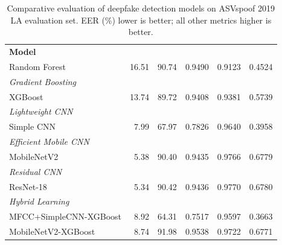 \begin{table}[ht]
  \centering
  \caption{Comparative evaluation of deepfake detection models on ASVspoof 2019 LA evaluation set. EER (\%) lower is better; all other metrics higher is better.}
  \label{tab:performance}
  \begin{tabular}{lrrrrr}
    \toprule
    \textbf{Model} & \textbf{EER (%
    \midrule
    \multicolumn{6}{l}{\textit{Classical Ensemble}} \\
    Random Forest & 16.51 & 90.74 & 0.9490 & 0.9123 & 0.4524 \\
    \midrule
    \multicolumn{6}{l}{\textit{Gradient Boosting}} \\
    XGBoost & 13.74 & 89.72 & 0.9408 & 0.9381 & 0.5739 \\
    \midrule
    \multicolumn{6}{l}{\textit{Lightweight CNN}} \\
    Simple CNN & 7.99 & 67.97 & 0.7826 & 0.9640 & 0.3958 \\
    \midrule
    \multicolumn{6}{l}{\textit{Efficient Mobile CNN}} \\
    MobileNetV2 & 5.38 & 90.40 & 0.9435 & 0.9766 & 0.6779 \\
    \midrule
    \multicolumn{6}{l}{\textit{Residual CNN}} \\
    ResNet-18 & 5.34 & 90.42 & 0.9436 & 0.9770 & 0.6780 \\
    \midrule
    \multicolumn{6}{l}{\textit{Hybrid Learning}} \\
    MFCC+SimpleCNN-XGBoost & 8.92 & 64.31 & 0.7517 & 0.9597 & 0.3663 \\
    MobileNetV2-XGBoost & 8.74 & 91.98 & 0.9538 & 0.9722 & 0.6771 \\
    \bottomrule
  \end{tabular}
\end{table}
